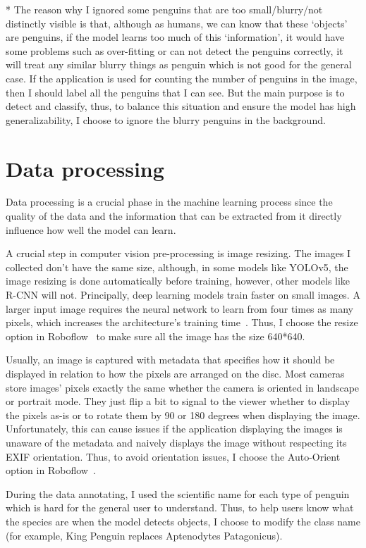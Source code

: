 \documentclass[runningheads]{llncs}
\begin{document}
* The reason why I ignored some penguins that are too small/blurry/not distinctly visible is that, although as humans, we can know that these `objects' are penguins, if the model learns too much of this `information', it would have some problems such as over-fitting or can not detect the penguins correctly, it will treat any similar blurry things as penguin which is not good for the general case. If the application is used for counting the number of penguins in the image, then I should label all the penguins that I can see. But the main purpose is to detect and classify, thus, to balance this situation and ensure the model has high generalizability, I choose to ignore the blurry penguins in the background.

\section{Data processing}
Data processing is a crucial phase in the machine learning process since the quality of the data and the information that can be extracted from it directly influence how well the model can learn. 

A crucial step in computer vision pre-processing is image resizing. The images I collected don't have the same size, although, in some models like YOLOv5, the image resizing is done automatically before training, however, other models like R-CNN will not. Principally, deep learning models train faster on small images. A larger input image requires the neural network to learn from four times as many pixels, which increases the architecture's training time~\cite{resize}. Thus, I choose the resize option in Roboflow~\cite{ref_roboflow} to make sure all the image has the size 640*640.

Usually, an image is captured with metadata that specifies how it should be displayed in relation to how the pixels are arranged on the disc. Most cameras store images' pixels exactly the same whether the camera is oriented in landscape or portrait mode. They just flip a bit to signal to the viewer whether to display the pixels as-is or to rotate them by 90 or 180 degrees when displaying the image. Unfortunately, this can cause issues if the application displaying the images is unaware of the metadata and naively displays the image without respecting its EXIF orientation. Thus, to avoid orientation issues, I choose the Auto-Orient option in Roboflow~\cite{ref_roboflow}.

During the data annotating, I used the scientific name for each type of penguin which is hard for the general user to understand. Thus, to help users know what the species are when the model detects objects, I choose to modify the class name (for example, King Penguin replaces Aptenodytes Patagonicus).
\end{document}
